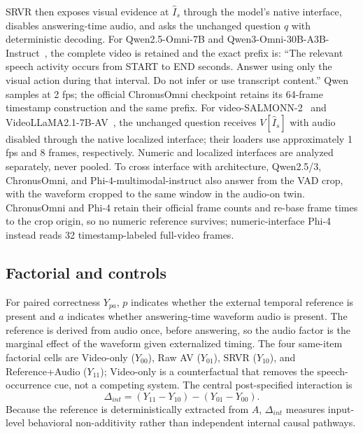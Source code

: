 SRVR then exposes visual evidence at $\hat I_s$ through the model's native interface, disables answering-time audio, and asks the unchanged question $q$ with deterministic decoding. For Qwen2.5-Omni-7B and Qwen3-Omni-30B-A3B-Instruct~\cite{xu2025qwen25omni,xu2025qwen3omni}, the complete video is retained and the exact prefix is: ``The relevant speech activity occurs from START to END seconds. Answer using only the visual action during that interval. Do not infer or use transcript content.'' Qwen samples at 2 fps; the official ChronusOmni checkpoint retains its 64-frame timestamp construction and the same prefix. For video-SALMONN-2~\cite{tang2025videosalmonn2} and VideoLLaMA2.1-7B-AV~\cite{cheng2024videollama2}, the unchanged question receives $V[\hat I_s]$ with audio disabled through the native localized interface; their loaders use approximately 1 fps and 8 frames, respectively. Numeric and localized interfaces are analyzed separately, never pooled. To cross interface with architecture, Qwen2.5/3, ChronusOmni, and Phi-4-multimodal-instruct also answer from the VAD crop, with the waveform cropped to the same window in the audio-on twin. ChronusOmni and Phi-4 retain their official frame counts and re-base frame times to the crop origin, so no numeric reference survives; numeric-interface Phi-4 instead reads 32 timestamp-labeled full-video frames.

\begin{table}[t]
\centering
\caption{Locked CMTB-291 accuracy (\%). Waveform denotes answering-time audio; timing is derived beforehand. The first three rows define the central nine-test reporting family; the rest are scope checks. $\Delta_{int}$ uses unrounded proportions. $\dagger$: restricting to the $N=231$ items parsed in all four cells gives $+6.1$ pp $[+0.4,+11.7]$ and no negative reversal.}
\label{tab:main}

\end{table}

\subsection{Factorial and controls}

For paired correctness $Y_{pa}$, $p$ indicates whether the external temporal reference is present and $a$ indicates whether answering-time waveform audio is present. The reference is derived from audio once, before answering, so the audio factor is the marginal effect of the waveform given externalized timing. The four same-item factorial cells are Video-only ($Y_{00}$), Raw AV ($Y_{01}$), SRVR ($Y_{10}$), and Reference+Audio ($Y_{11}$); Video-only is a counterfactual that removes the speech-occurrence cue, not a competing system. The central post-specified interaction is
\begin{equation}
\Delta_{int}=(Y_{11}-Y_{10})-(Y_{01}-Y_{00}).
\end{equation}
Because the reference is deterministically extracted from $A$, $\Delta_{int}$ measures input-level behavioral non-additivity rather than independent internal causal pathways.

